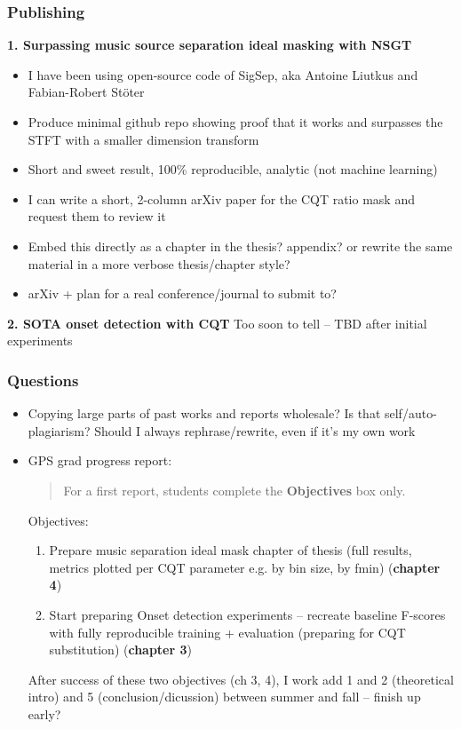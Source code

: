 \documentclass[usenames,dvipsnames]{beamer}
\begin{document}
\begin{frame}
	\frametitle{Publishing}
	\textbf{1. Surpassing music source separation ideal masking with NSGT}
	\begin{itemize}
		\item
			I have been using open-source code of SigSep, aka Antoine Liutkus and Fabian-Robert St{\"o}ter
		\item
			Produce minimal github repo showing proof that it works and surpasses the STFT with a smaller dimension transform
		\item
			Short and sweet result, 100\% reproducible, analytic (not machine learning)
		\item
			I can write a short, 2-column arXiv paper for the CQT ratio mask and request them to review it
		\item
			Embed this directly as a chapter in the thesis? appendix? or rewrite the same material in a more verbose thesis/chapter style?
		\item
			arXiv + plan for a real conference/journal to submit to?
	\end{itemize}
	\textbf{2. SOTA onset detection with CQT}
	Too soon to tell -- TBD after initial experiments
\end{frame}

\begin{frame}
	\frametitle{Questions}
	\begin{itemize}
		\item
			Copying large parts of past works and reports wholesale? Is that self/auto-plagiarism? Should I always rephrase/rewrite, even if it's my own work
		\item
			GPS grad progress report:\\
			\begin{quote}
			For a first report, students complete the \textbf{Objectives} box only.
			\end{quote}
			Objectives:
			\begin{enumerate}
				\item
					Prepare music separation ideal mask chapter of thesis (full results, metrics plotted per CQT parameter e.g. by bin size, by fmin) (\textbf{chapter 4})
				\item
					Start preparing Onset detection experiments -- recreate baseline F-scores with fully reproducible training + evaluation (preparing for CQT substitution) (\textbf{chapter 3})
			\end{enumerate}
			After success of these two objectives (ch 3, 4), I work add 1 and 2 (theoretical intro) and 5 (conclusion/dicussion) between summer and fall -- finish up early?
	\end{itemize}
\end{frame}
\end{document}
